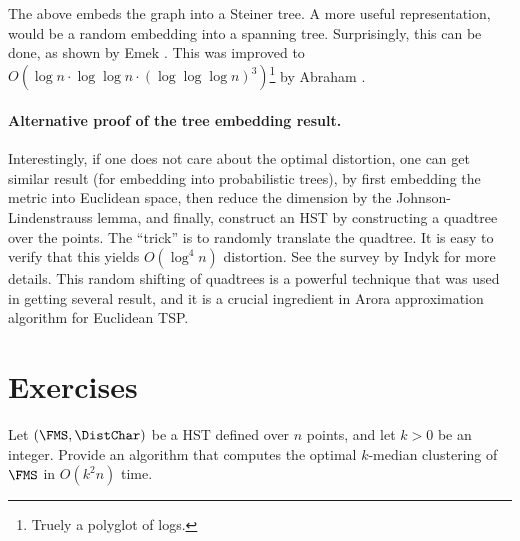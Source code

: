 The above embeds the graph into a Steiner tree. A more useful
representation, would be a random embedding into a spanning
tree. Surprisingly, this can be done, as shown by \si{Emek} \etal
\cite{eest-lsst-08}. This was improved to
$O( \log n \cdot \log \log n \cdot ( \log \log \log n)^3
)$\footnote{Truely a polyglot of logs.} by Abraham \etal
\cite{abn-ntlss-08, abn-ntlsst-08-arxiv}.

\paragraph*{Alternative proof of the tree embedding result.}

Interestingly, if one does not care about the optimal distortion, one
can get similar result (for embedding into probabilistic trees), by
first embedding the metric into Euclidean space, then reduce the
dimension by the Johnson-Lindenstrauss lemma, and finally, construct
an HST by constructing a quadtree over the points. The ``trick'' is to
randomly translate the quadtree. It is easy to verify that this yields
$O( \log^4 n)$ distortion. See the survey by Indyk \cite{i-aaldg-01}
for more details. This random shifting of quadtrees is a powerful
technique that was used in getting several result, and it is a crucial
ingredient in Arora \cite{a-ptase-98} approximation algorithm for
Euclidean TSP.








\section{Exercises}

\begin{exercise}
    Let $(\FMS,\DistChar)$ be a HST defined over $n$ points, and let $k >
    0$ be an integer. Provide an algorithm that computes the optimal
    $k$-median clustering of $\FMS$ in $O(k^2 n )$ time.
    
\end{exercise}


